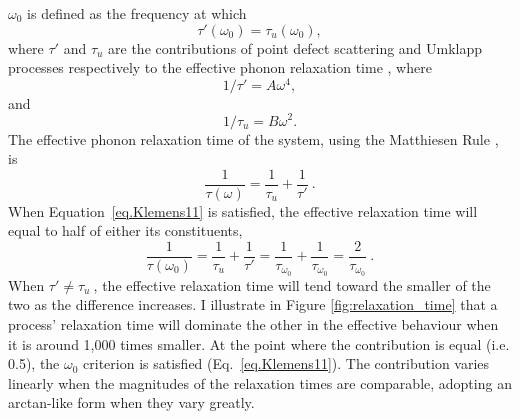$\omega_{\mathrm{0}}$ is defined \citep[by][Eq.~11]{Klemens1960} as the frequency at which 
%
\begin{equation}
{\tau}'\left ( \omega_{\mathrm{0}} \right ) = \tau_{u}\left ( \omega_{\mathrm{0}} \right ),
\label{eq.Klemens11}
\end{equation}
%
where ${\tau}'$ and $\tau_{u}$ are the contributions of point defect scattering and Umklapp processes respectively to the effective phonon relaxation time \citep[][Eq.~2~\&~3]{Klemens1960}, where
%
\begin{equation}
1/{\tau}'= A\omega^{4},
\label{eq.Klemens2}
\end{equation}
%
and 
%
\begin{equation}
1/\tau_{u}=B\omega^{2}.
\label{eq.Klemens3}
\end{equation}
%
The effective phonon relaxation time of the system, using the Matthiesen Rule \citep[modified from][Eq.~7]{Klemens1960}, is  
%
\begin{equation}
\frac{1}{\tau \left ( \omega \right )} = \frac{1}{\tau_{u}} + \frac{1}{{\tau}'}\ .
\label{eq.Klemens7}
\end{equation}
%
When Equation~\ref{eq.Klemens11} is satisfied, the effective relaxation time will equal to half of either its constituents,
%
\begin{equation}
\frac{1}{\tau \left ( \omega_{0} \right )} = \frac{1}{\tau_{u}} + \frac{1}{{\tau}'} = \frac{1}{\tau_{\omega_{0}}} + \frac{1}{\tau_{\omega_{0}}} = \frac{2}{\tau_{\omega_{0}}}\ .
\label{eq.Klemens7ex}
\end{equation}
%
When ${\tau}' \neq \tau_{u}\ $, the effective relaxation time will tend toward the smaller of the two as the difference increases. I illustrate in Figure \ref{fig:relaxation_time} that a process' relaxation time will dominate the other in the effective behaviour when it is around 1,000 times smaller. At the point where the contribution is equal (i.e. 0.5), the $\omega_{0}$ criterion is satisfied (Eq.~\ref{eq.Klemens11}). The contribution varies linearly when the magnitudes of the relaxation times are comparable, adopting an arctan-like form when they vary greatly. 

